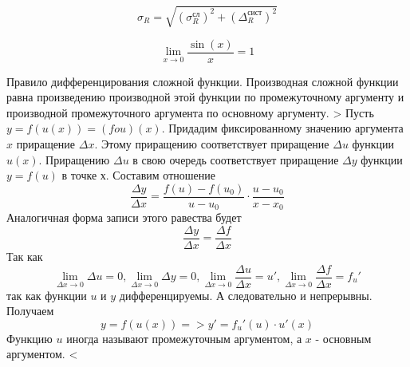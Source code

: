 \documentclass[a4paper,12pt]{article}
\begin{document}
 \begin{equation}
 \sigma_R = \sqrt{(\sigma^{\text{сл}}_R)^2+(\Delta^{\text{сист}}_R)^2}
 \end{equation}  
 
 \begin{equation}
 \lim_{x\to 0} \frac{\sin(x)}{x}=1
 \end{equation}  

Правило дифференцирования сложной функции.
Производная сложной функции равна произведению производной этой функции по промежуточному аргументу и производной промежуточного аргумента по основному аргументу.
>
    Пусть $y = f(u(x)) = (f o u)(x)$. Придадим фиксированному значению аргумента $x$ приращение $\Delta{x}$. Этому приращению соответствует приращение $\Delta{u}$ функции $u(x)$. Приращению $\Delta{u}$ в свою очередь соответствует приращение $\Delta{y}$ функции $y = f(u)$ в точке $х$.
    Составим отношение
    \begin{equation}
        \frac {\Delta{y}} {\Delta{x}} = \frac {f(u) - f({u}_0)} {u - {u}_0} \cdot \frac {u - {u}_0} {x - {x}_0}
    \end{equation}  
    Аналогичная форма записи этого равества будет
    \begin{equation}
        \frac {\Delta{y}} {\Delta{x}} = \frac {\Delta{f}} {\Delta{x}}
    \end{equation}
    Так как
    \begin{equation}
        \lim_{\Delta{x}\to 0} \Delta{u} = 0,  \lim_{\Delta{x}\to 0} \Delta{y} = 0,  
        \lim_{\Delta{x}\to 0} \frac{\Delta{u}} {\Delta{x}} = u',  \lim_{\Delta{x}\to 0} \frac{\Delta{f}} {\Delta{x}} = {{f}_u}'
    \end{equation}
    так как функции $u$ и $y$ дифференцируемы. А следовательно и непрерывны.
    Получаем
    \begin{equation}
        y = f(u(x)) => y' = {{f}_u}'(u) \cdot u'(x)
    \end{equation}
    Функцию $u$ иногда называют промежуточным аргументом, а $x$ - основным аргументом.
<
 
\end{document}
